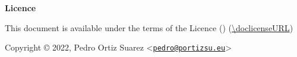 \newpage  %
\thispagestyle{empty}
\begin{center}
	{\Huge\bfseries Licence}

	\vfill
	\Large
	This document is available under the terms of the \doclicenseLongName Licence (\doclicenseName) (\url{\doclicenseURL})

	\vfill
	Copyright © 2022, Pedro Ortiz Suarez <\href{mailto:pedro@portizsu.eu}{\nolinkurl{pedro@portizsu.eu}}>

	\vfill
	\doclicenseImage
\end{center}

\vfill